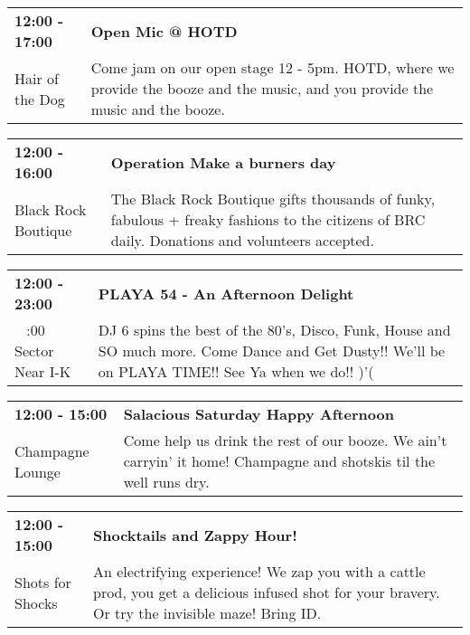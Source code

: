 \begin{tabular}{ p{1in} p{2.2in} }
    \textbf{12:00 - 17:00} & \textbf{Open Mic @ HOTD} \\
    Hair of the Dog \newline  & Come jam on our open stage 12 - 5pm. HOTD, where we provide the booze and the music, and you provide the music and the booze. \\
    \hline 
\end{tabular}
    
\begin{tabular}{ p{1in} p{2.2in} }
    \textbf{12:00 - 16:00} & \textbf{Operation Make a burners day} \\
    Black Rock Boutique \newline  & The Black Rock Boutique gifts thousands of funky, fabulous + freaky fashions to the citizens of BRC daily.  Donations and volunteers accepted. \\
    \hline 
\end{tabular}
    
\begin{tabular}{ p{1in} p{2.2in} }
    \textbf{12:00 - 23:00} & \textbf{PLAYA 54 - An Afternoon Delight} \\
    ~ \newline 9:00 Sector Near I-K & DJ 6 spins the best of the 80's, Disco, Funk, House and SO much more. Come Dance and Get Dusty!! We'll be on PLAYA TIME!! See Ya when we do!! )'( \\
    \hline 
\end{tabular}
    
\begin{tabular}{ p{1in} p{2.2in} }
    \textbf{12:00 - 15:00} & \textbf{Salacious Saturday Happy Afternoon} \\
    Champagne Lounge \newline  & Come help us drink the rest of our booze. We ain't carryin' it home! Champagne and shotskis til the well runs dry. \\
    \hline 
\end{tabular}
    
\begin{tabular}{ p{1in} p{2.2in} }
    \textbf{12:00 - 15:00} & \textbf{Shocktails and Zappy Hour! } \\
    Shots for Shocks \newline  & An electrifying experience! We zap you with a cattle prod, you get a delicious infused shot for your bravery. Or try the invisible maze! Bring ID. \\
    \hline 
\end{tabular}
    
